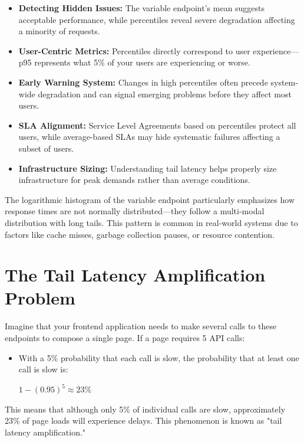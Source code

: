 \documentclass[12pt,letterpaper]{article}
\begin{document}
\begin{itemize}
    \item \textbf{Detecting Hidden Issues:} The variable endpoint's mean suggests acceptable performance, while percentiles reveal severe degradation affecting a minority of requests.
    \item \textbf{User-Centric Metrics:} Percentiles directly correspond to user experience—p95 represents what 5\% of your users are experiencing or worse.
    \item \textbf{Early Warning System:} Changes in high percentiles often precede system-wide degradation and can signal emerging problems before they affect most users.
    \item \textbf{SLA Alignment:} Service Level Agreements based on percentiles protect all users, while average-based SLAs may hide systematic failures affecting a subset of users.
    \item \textbf{Infrastructure Sizing:} Understanding tail latency helps properly size infrastructure for peak demands rather than average conditions.
\end{itemize}

The logarithmic histogram of the variable endpoint particularly emphasizes how response times are not normally distributed—they follow a multi-modal distribution with long tails. This pattern is common in real-world systems due to factors like cache misses, garbage collection pauses, or resource contention.

\section{The Tail Latency Amplification Problem}

Imagine that your frontend application needs to make several calls to these endpoints to compose a single page. If a page requires 5 API calls:

\begin{itemize}
    \item With a 5\% probability that each call is slow, the probability that at least one call is slow is:
    \begin{center}
    $1 - (0.95)^5 \approx 23\%$
    \end{center}
\end{itemize}

This means that although only 5\% of individual calls are slow, approximately 23\% of page loads will experience delays. This phenomenon is known as "tail latency amplification."
\end{document}
